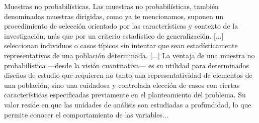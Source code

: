 \documentclass[11pt,a4paper]{article}
\newcommand{\campo}[1]{\textcolor{gris}{\footnotesize #1}}
\begin{document}
\vspace{3pt}\noindent{\small\textbf{p.\ 215} \quad \campo{El conjunto de casos de estudio «no es una muestra estadística de ese universo, sino una selección intencional por valor probatorio ---una muestra dirigida, no probabilística---» --- equivalencia entre muestra no probabilística y muestra dirigida, y su selección por características del estudio y no por criterio estadístico de...}}\par
\begin{pasaje}\footnotesize Muestras no probabilísticas. Las muestras no probabilísticas, también denominadas muestras dirigidas, como ya te mencionamos, suponen un procedimiento de selección orientado por las características y contexto de la investigación, más que por un criterio estadístico de generalización. [...] seleccionan individuos o casos típicos sin intentar que sean estadísticamente representativos de una población determinada. [...] La ventaja de una muestra no probabilística ---desde la visión cuantitativa--- es su utilidad para determinados diseños de estudio que requieren no tanto una representatividad de elementos de una población, sino una cuidadosa y controlada elección de casos con ciertas características especificadas previamente en el planteamiento del problema. Su valor reside en que las unidades de análisis son estudiadas a profundidad, lo que permite conocer el comportamiento de las variables...\end{pasaje}
\vspace{6pt}
\end{document}
